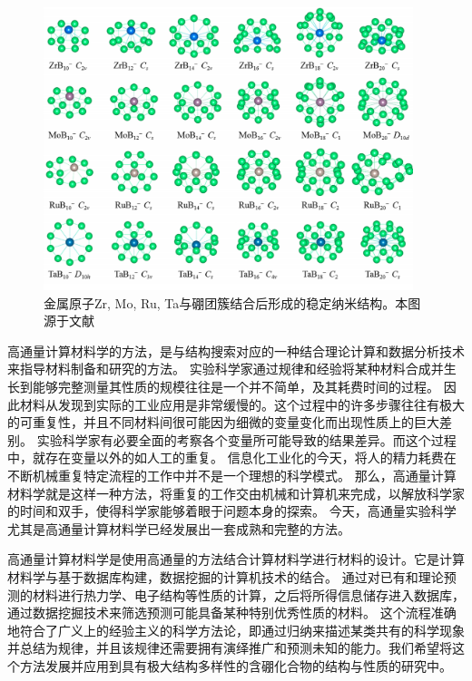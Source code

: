 \begin{figure}[bt]
  \includegraphics[width=0.96\textwidth]{figs/ch1_boron_cluster02.png}
  \centering
  \caption{金属原子Zr, Mo, Ru, Ta与硼团簇结合后形成的稳定纳米结构。本图源于文献\cite{tian2019cluster}}
  \label{fig:ch1_boron_cluster02}
\end{figure}

高通量计算材料学的方法，是与结构搜索对应的一种结合理论计算和数据分析技术来指导材料制备和研究的方法。
实验科学家通过规律和经验将某种材料合成并生长到能够完整测量其性质的规模往往是一个并不简单，及其耗费时间的过程。
因此材料从发现到实际的工业应用是非常缓慢的。这个过程中的许多步骤往往有极大的可重复性，并且不同材料间很可能因为细微的变量变化而出现性质上的巨大差别。
实验科学家有必要全面的考察各个变量所可能导致的结果差异。而这个过程中，就存在变量以外的如人工的重复。
信息化工业化的今天，将人的精力耗费在不断机械重复特定流程的工作中并不是一个理想的科学模式。
那么，高通量计算材料学就是这样一种方法，将重复的工作交由机械和计算机来完成，以解放科学家的时间和双手，使得科学家能够着眼于问题本身的探索。
今天，高通量实验科学尤其是高通量计算材料学已经发展出一套成熟和完整的方法\cite{curtarolo2003predicting, ceder1998identification, johannesson2002combined, curtarolo2005accuracy, xiang1995combinatorial, koinuma2004combinatorial, takeuchi2003identification}。

高通量计算材料学是使用高通量的方法结合计算材料学进行材料的设计。它是计算材料学与基于数据库构建，数据挖掘的计算机技术的结合。
通过对已有和理论预测的材料进行热力学、电子结构等性质的计算，之后将所得信息储存进入数据库，通过数据挖掘技术来筛选预测可能具备某种特别优秀性质的材料。
这个流程准确地符合了广义上的经验主义的科学方法论，即通过归纳来描述某类共有的科学现象并总结为规律，并且该规律还需要拥有演绎推广和预测未知的能力。我们希望将这个方法发展并应用到具有极大结构多样性的含硼化合物的结构与性质的研究中。


